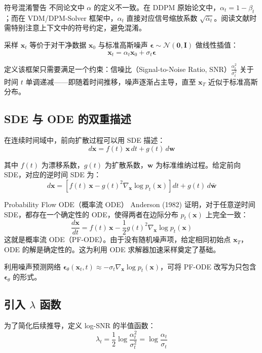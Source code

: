 \begin{warningbox}{符号混淆警告}
不同论文中 $\alpha$ 的定义不一致。在 DDPM 原始论文中，$\alpha_t = 1 - \beta_t$；而在 VDM/DPM-Solver 框架中，$\alpha_t$ 直接对应信号缩放系数 $\sqrt{\bar{\alpha}_t}$。阅读文献时需特别注意上下文中的符号约定，避免混淆。
\end{warningbox}

采样 $\mathbf{x}_t$ 等价于对干净数据 $\mathbf{x}_0$ 与标准高斯噪声 $\boldsymbol{\epsilon} \sim \mathcal{N}(\mathbf{0}, \mathbf{I})$ 做线性插值：
$$\mathbf{x}_t = \alpha_t \mathbf{x}_0 + \sigma_t \boldsymbol{\epsilon}$$

定义该框架只需要满足一个约束：信噪比（Signal-to-Noise Ratio, SNR）$\frac{\alpha_t^2}{\sigma_t^2}$ 关于时间 $t$ 单调递减——即随着时间推移，噪声逐渐占主导，直至 $\mathbf{x}_T$ 近似于标准高斯分布。

\subsection{SDE 与 ODE 的双重描述}

在连续时间域中，前向扩散过程可以用 SDE 描述：
$$d\mathbf{x} = f(t)\, \mathbf{x}\, dt + g(t)\, d\mathbf{w}$$

其中 $f(t)$ 为漂移系数，$g(t)$ 为扩散系数，$\mathbf{w}$ 为标准维纳过程。给定前向 SDE，对应的逆时间 SDE 为：
$$d\mathbf{x} = \left[f(t)\, \mathbf{x} - g(t)^2 \nabla_{\mathbf{x}} \log p_t(\mathbf{x})\right] dt + g(t)\, d\bar{\mathbf{w}}$$

\begin{importantbox}{Probability Flow ODE（概率流 ODE）}
Anderson (1982) 证明，对于任意逆时间 SDE，都存在一个确定性的 ODE，使得两者在边际分布 $p_t(\mathbf{x})$ 上完全一致：
$$\frac{d\mathbf{x}}{dt} = f(t)\, \mathbf{x} - \frac{1}{2} g(t)^2 \nabla_{\mathbf{x}} \log p_t(\mathbf{x})$$
这就是概率流 ODE（PF-ODE）。由于没有随机噪声项，给定相同初始点 $\mathbf{x}_T$，ODE 的解是确定性的。这为利用 ODE 求解器加速采样奠定了基础。
\end{importantbox}

利用噪声预测网络 $\boldsymbol{\epsilon}_\theta(\mathbf{x}_t, t) \approx -\sigma_t \nabla_{\mathbf{x}} \log p_t(\mathbf{x})$，可将 PF-ODE 改写为只包含 $\boldsymbol{\epsilon}_\theta$ 的形式。

\subsection{引入 $\lambda$ 函数}

为了简化后续推导，定义 log-SNR 的半值函数：
$$\lambda_t = \frac{1}{2} \log \frac{\alpha_t^2}{\sigma_t^2} = \log \frac{\alpha_t}{\sigma_t}$$

